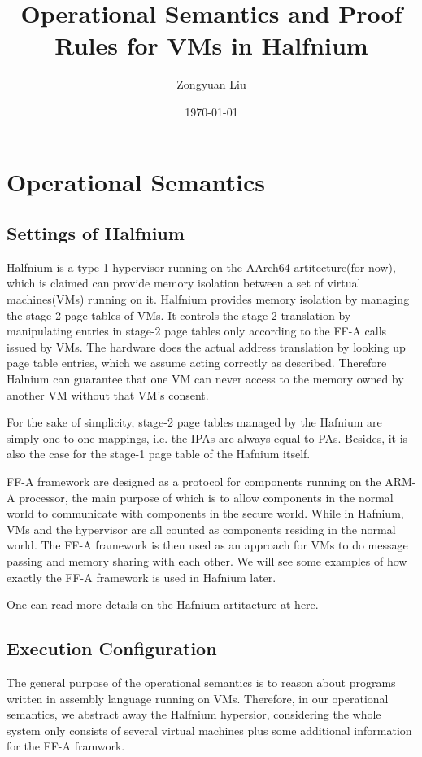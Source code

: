 \documentclass[a4paper]{article} \usepackage[a4paper]{geometry}
\title{Operational Semantics and Proof Rules for VMs in Halfnium}
\date{\today}
\author{Zongyuan Liu}
\begin{document}
\maketitle

\section{Operational Semantics}

\subsection{Settings of Halfnium}
Halfnium is a type-1 hypervisor running on the AArch64 artitecture(for now),
which is claimed can provide memory isolation between a set of virtual
machines(VMs) running on it. Halfnium provides memory isolation by managing the
stage-2 page tables of VMs. It controls the stage-2 translation by manipulating
entries in stage-2 page tables only according to the FF-A calls issued by VMs.
The hardware does the actual address translation by looking up page table
entries, which we assume acting correctly as described. Therefore Halnium can
guarantee that one VM can never access to the memory owned by another VM without
that VM's consent.

For the sake of simplicity, stage-2 page tables managed by the Hafnium are
simply one-to-one mappings, i.e. the IPAs are always equal to PAs. Besides, it
is also the case for the stage-1 page table of the Hafnium itself.

FF-A framework are designed as a protocol for components running on the ARM-A
processor, the main purpose of which is to allow components in the normal world
to communicate with components in the secure world. While in Hafnium, VMs and
the hypervisor are all counted as components residing in the normal world. The
FF-A framework is then used as an approach for VMs to do message passing and
memory sharing with each other. We will see some examples of how exactly the
FF-A framework is used in Hafnium later.

One can read more details on the Hafnium artitacture at here.

\subsection{Execution Configuration}
 The general purpose of the operational semantics
is to reason about programs written in assembly language running on VMs.
Therefore, in our operational semantics, we abstract away the Halfnium
hypersior, considering the whole system only consists of several virtual
machines plus some additional information for the FF-A framwork.
\end{document}
